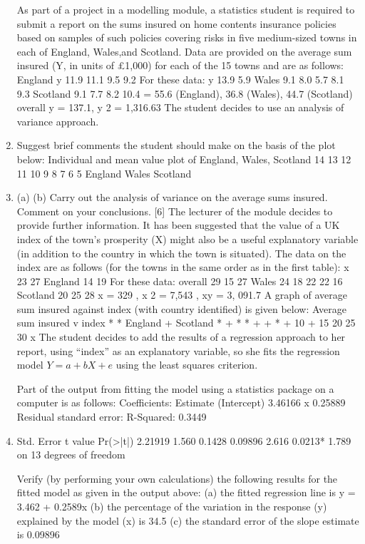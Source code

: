 \documentclass[a4paper,12pt]{article}
\begin{document}
\begin{enumerate}As part of a project in a modelling module, a statistics student is required to submit a
report on the sums insured on home contents insurance policies based on samples of such policies covering risks in five medium-sized towns in each of England, Wales,and Scotland. Data are provided on the average sum insured (Y, in units of £1,000)
for each of the 15 towns and are as follows:
England
y 11.9 11.1 9.5 9.2
For these data:
\sum y
13.9
5.9
Wales
9.1 8.0 5.7
8.1
9.3
Scotland
9.1 7.7 8.2
10.4
= 55.6 (England), 36.8 (Wales), 44.7 (Scotland)
overall
\sum y = 137.1, \sum y 2
= 1,316.63
The student decides to use an analysis of variance approach.
\item 
Suggest brief comments the student should make on the basis of the plot
below:
Individual and mean value plot of England, Wales, Scotland
14
13
12
11
10
9
8
7
6
5
England
Wales
Scotland

\item 
(a)
(b)
Carry out the analysis of variance on the average sums insured.
Comment on your conclusions.
[6]
The lecturer of the module decides to provide further information. It has been suggested that the value of a UK index of the town’s prosperity (X) might also be a useful explanatory variable (in addition to the country in which the town is situated).
The data on the index are as follows (for the towns in the same order as in the first
table):
x
23
27
England
14 19
For these data: overall
29
15
27
Wales
24 18
22
22
16
Scotland
20 25
28
\sum x = 329 , \sum x 2 = 7,543 , \sum xy = 3, 091.7
A graph of average sum insured against index (with country identified) is given
below:
Average sum insured v index
*
* England
+ Scotland
*
+
*
*
+
+
*
%
+
%
10
%
+
%
%
15
20
25
30
x
The student decides to add the results of a regression approach to her report, using “index” as an explanatory variable, so she fits the regression model
$Y = a + bX + e$
using the least squares criterion.


Part of the output from fitting the model using a statistics package on a computer is as follows:
Coefficients: Estimate
(Intercept) 3.46166
x
0.25889
Residual standard error:
R-Squared: 0.3449
\item 
Std. Error t value Pr(>|t|)
2.21919
1.560 0.1428
0.09896
2.616 0.0213*
1.789 on 13 degrees of freedom


Verify (by performing your own calculations) the following results for the fitted model as given in the output above:
(a) the fitted regression line is y = 3.462 + 0.2589x
(b) the percentage of the variation in the response (y) explained by the model (x) is 34.5%
(c) the standard error of the slope estimate is 0.09896


\end{enumerate}
\end{document}
